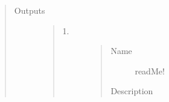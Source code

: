 \documentclass[letterpaper,10pt,english]{sphinxmanual}
\begin{document}
\begin{quote}
\begin{description}
\begin{quote}
\begin{description}
\end{description}\end{quote}

\item[{Outputs}] \leavevmode\begin{quote}\begin{description}
\item[{1.}] \leavevmode\begin{quote}\begin{description}
\item[{Name}] \leavevmode
readMe!

\item[{Description}] \leavevmode
{}

\end{description}\end{quote}

\end{description}\end{quote}

\end{description}\end{quote}
\end{document}
